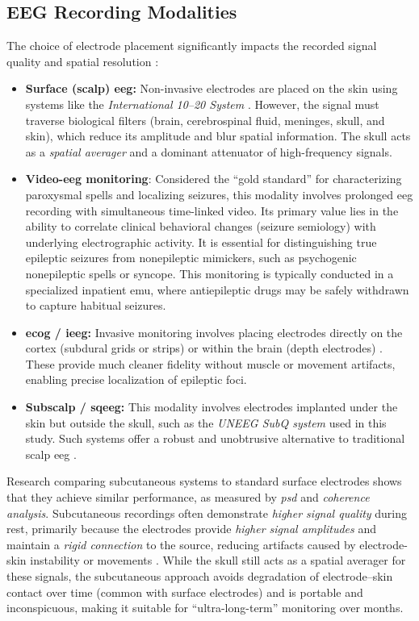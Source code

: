 \subsection{EEG Recording Modalities}
The choice of electrode placement significantly impacts the recorded signal quality and spatial resolution \parencite{st_louis_electroencephalography_2016}:
\begin{itemize}
    \item \textbf{Surface (scalp) \gls{eeg}:} Non-invasive electrodes are placed on the skin using systems like the \textit{International 10--20 System} \parencite{klem_ten-twenty_1999}.
    However, the signal must traverse biological filters (brain, cerebrospinal fluid, meninges, skull, and skin), which reduce its amplitude and blur spatial information. 
    The skull acts as a \textit{spatial averager} and a dominant attenuator of high-frequency signals.
    \item \textbf{Video-\gls{eeg} monitoring}: Considered the \enquote{gold standard} for characterizing paroxysmal spells and localizing seizures, this modality involves prolonged \gls{eeg} recording with simultaneous time-linked video. 
    Its primary value lies in the ability to correlate clinical behavioral changes (seizure semiology) with underlying electrographic activity. 
    It is essential for distinguishing true epileptic seizures from nonepileptic mimickers, such as psychogenic nonepileptic spells or syncope. 
    This monitoring is typically conducted in a specialized inpatient \gls{emu}, where antiepileptic drugs may be safely withdrawn to capture habitual seizures.
    \item \textbf{\Gls{ecog} / \gls{ieeg}:} Invasive monitoring involves placing electrodes directly on the cortex (subdural grids or strips) or within the brain (depth electrodes) \parencite{jayakar_diagnostic_2016}. 
    These provide much cleaner fidelity without muscle or movement artifacts, enabling precise localization of epileptic foci.
    \item \textbf{Subscalp / \gls{sqeeg}:} This modality involves electrodes implanted under the skin but outside the skull, such as the \textit{UNEEG SubQ system} used in this study.
    Such systems offer a robust and unobtrusive alternative to traditional scalp \gls{eeg} \parencite{duun-henriksen_subdural_2013}.
\end{itemize}

Research comparing subcutaneous systems to standard surface electrodes shows that they achieve similar performance, as measured by \textit{\gls{psd}} and \textit{coherence analysis}.
Subcutaneous recordings often demonstrate \textit{higher signal quality} during rest, primarily because the electrodes provide \textit{higher signal amplitudes} and maintain a \textit{rigid connection} to the source, reducing artifacts caused by electrode-skin instability or movements \parencite{duun-henriksen_eeg_2015}.
While the skull still acts as a spatial averager for these signals, the subcutaneous approach avoids degradation of electrode--skin contact over time (common with surface electrodes) and is portable and inconspicuous, making it suitable for \enquote{ultra-long-term} monitoring over months.



